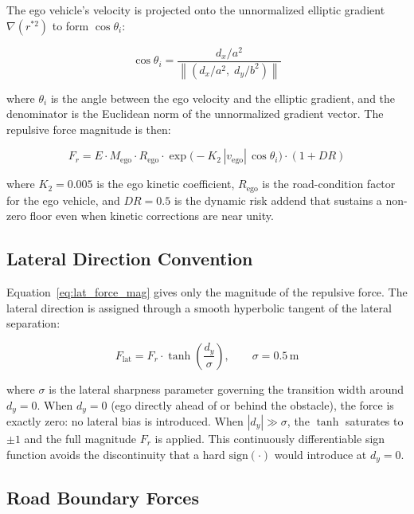 \documentclass[12pt,a4paper,oneside]{report}
\begin{document}
The ego vehicle's velocity is projected onto the unnormalized elliptic gradient $\nabla(r^{*2})$ to form $\cos\theta_i$:

\begin{equation}
\cos\theta_i = \frac{d_x / a^2}{\left\|(d_x / a^2,\; d_y / b^2)\right\|}
\label{eq:lat_cos_theta_i}
\end{equation}

where $\theta_i$ is the angle between the ego velocity and the elliptic gradient, and the denominator is the Euclidean norm of the unnormalized gradient vector. The repulsive force magnitude is then:

\begin{equation}
F_r = E \cdot M_{\mathrm{ego}} \cdot R_{\mathrm{ego}} \cdot \exp\!\bigl(-K_2\,|v_{\mathrm{ego}}|\,\cos\theta_i\bigr) \cdot (1 + DR)
\label{eq:lat_force_mag}
\end{equation}

where $K_2 = 0.005$ is the ego kinetic coefficient, $R_{\mathrm{ego}}$ is the road-condition factor for the ego vehicle, and $DR = 0.5$ is the dynamic risk addend that sustains a non-zero floor even when kinetic corrections are near unity.

\subsection{Lateral Direction Convention}
\label{sec:lat_direction}

Equation~\ref{eq:lat_force_mag} gives only the magnitude of the repulsive force. The lateral direction is assigned through a smooth hyperbolic tangent of the lateral separation:

\begin{equation}
F_{\mathrm{lat}} = F_r \cdot \tanh\!\left(\frac{d_y}{\sigma}\right), \qquad \sigma = 0.5\,\mathrm{m}
\label{eq:lat_direction}
\end{equation}

where $\sigma$ is the lateral sharpness parameter governing the transition width around $d_y = 0$. When $d_y = 0$ (ego directly ahead of or behind the obstacle), the force is exactly zero: no lateral bias is introduced. When $|d_y| \gg \sigma$, the $\tanh$ saturates to $\pm 1$ and the full magnitude $F_r$ is applied. This continuously differentiable sign function avoids the discontinuity that a hard $\mathrm{sign}(\cdot)$ would introduce at $d_y = 0$.

\subsection{Road Boundary Forces}
\label{sec:lat_boundaries}
\end{document}
